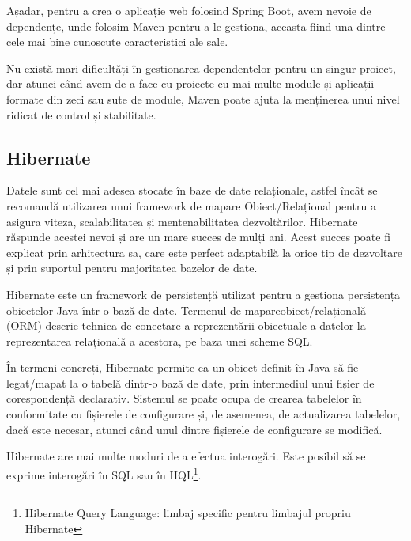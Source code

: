 Așadar, pentru a crea o aplicație web folosind Spring Boot, avem nevoie de dependențe, unde folosim Maven pentru a le gestiona, aceasta fiind una dintre cele mai bine cunoscute caracteristici ale sale.\newline

Nu există mari dificultăți în gestionarea dependențelor pentru un singur proiect, dar atunci când avem de-a face cu proiecte cu mai multe module și aplicații formate din zeci sau sute de module, Maven poate ajuta la menținerea unui nivel ridicat de control și stabilitate.\newline

\subsection{Hibernate}

Datele sunt cel mai adesea stocate în baze de date relaționale, astfel încât se recomandă utilizarea unui framework de mapare Obiect/Relațional pentru a asigura viteza, scalabilitatea și mentenabilitatea dezvoltărilor. Hibernate răspunde acestei nevoi și are un mare succes de mulți ani. Acest succes poate fi explicat prin arhitectura sa, care este perfect adaptabilă la orice tip de dezvoltare și prin suportul pentru majoritatea bazelor de date.\newline

Hibernate este un framework de persistență utilizat pentru a gestiona persistența obiectelor Java într-o bază de date. Termenul de mapare\newline obiect/relațională (ORM) descrie tehnica de conectare a reprezentării obiectuale a datelor la reprezentarea relațională a acestora, pe baza unei scheme SQL.\newline

În termeni concreți, Hibernate permite ca un obiect definit în Java să fie legat/mapat la o tabelă dintr-o bază de date, prin intermediul unui fișier de corespondență declarativ. Sistemul se poate ocupa de crearea tabelelor în conformitate cu fișierele de configurare și, de asemenea, de actualizarea tabelelor, dacă este necesar, atunci când unul dintre fișierele de configurare se modifică.\newline

Hibernate are mai multe moduri de a efectua interogări. Este posibil să se exprime interogări în SQL sau în HQL\footnote{Hibernate Query Language: limbaj specific pentru limbajul propriu Hibernate}.\newline

